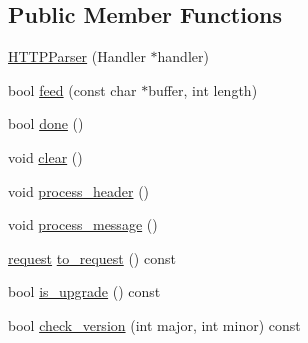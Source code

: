 \subsection*{Public Member Functions}
\begin{DoxyCompactItemize}
\item 
\hyperlink{structcrow_1_1_h_t_t_p_parser_a3659702ad1b853735ae6871f57bc2229}{H\-T\-T\-P\-Parser} (Handler $\ast$handler)
\item 
bool \hyperlink{structcrow_1_1_h_t_t_p_parser_a9ca5bdc64f7ce0ffa836c6263da0da45}{feed} (const char $\ast$buffer, int length)
\item 
bool \hyperlink{structcrow_1_1_h_t_t_p_parser_af0421fefc211d39c6ee676c5ba0083a5}{done} ()
\item 
void \hyperlink{structcrow_1_1_h_t_t_p_parser_abc4649eacc92efe28b8c41c1d434e749}{clear} ()
\item 
void \hyperlink{structcrow_1_1_h_t_t_p_parser_ae074619da72a866f764821a981444404}{process\-\_\-header} ()
\item 
void \hyperlink{structcrow_1_1_h_t_t_p_parser_a6aaafa15ad10e3165b547edecd66f174}{process\-\_\-message} ()
\item 
\hyperlink{structcrow_1_1request}{request} \hyperlink{structcrow_1_1_h_t_t_p_parser_a6ef156470083d0796108fb9d40ba9379}{to\-\_\-request} () const 
\item 
bool \hyperlink{structcrow_1_1_h_t_t_p_parser_abd1836a9e379b48f2d9cd004ae8ac299}{is\-\_\-upgrade} () const 
\item 
bool \hyperlink{structcrow_1_1_h_t_t_p_parser_ad25e62d7f2aaa7f3a4259f0edf049538}{check\-\_\-version} (int major, int minor) const 
\end{DoxyCompactItemize}
